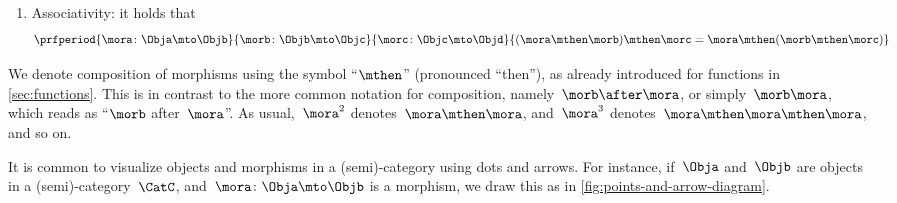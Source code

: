 \begin{ctdefinition}[Semicategory]
\begin{body}
        \condit
        \begin{enumerate}
            \item Associativity: it holds that
                  \begin{equation}
                      \prfperiod{
                          \mora\colon \Obja \mto \Objb
                      }{
                          \morb\colon \Objb \mto \Objc
                      }{
                          \morc\colon \Objc \mto \Objd
                      }{
                          (\mora\mthen \morb)
                          \mthen \morc= \mora \mthen (\morb \mthen \morc)
                      }
                  \end{equation}
        \end{enumerate}
    \end{body}
\end{ctdefinition}

\begin{remark}
    We denote composition of morphisms using the symbol ``$\mthen$'' (pronounced ``then''), as already introduced for functions in \cref{sec:functions}.
    This is in contrast to the more common notation for composition, namely~$\morb\after \mora$, or simply~$\morb \mora$, which reads as ``$\morb$ after~$\mora$''.
    As usual,~$\mora^2$ denotes~$\mora \mthen \mora$, and~$\mora^3$ denotes~$\mora \mthen \mora \mthen \mora$, and so on.
\end{remark}

\begin{marginfigure}
    \begin{center}
    \end{center}
    \caption{}
    \label{fig:points-and-arrow-diagram}
\end{marginfigure}

It is common to visualize objects and morphisms in a (semi)-category using dots and arrows.
For instance, if~$\Obja$ and~$\Objb$ are objects in a (semi)-category~$\CatC$, and~$\mora\colon \Obja \mto \Objb$ is a morphism, we draw this as in \cref{fig:points-and-arrow-diagram}.


